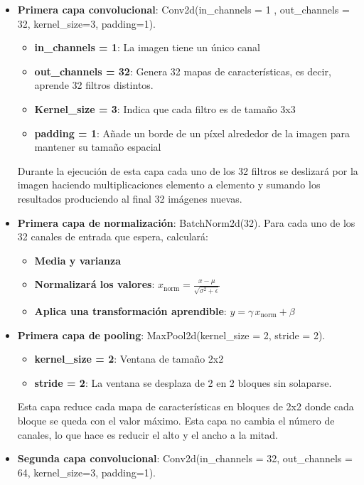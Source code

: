 \begin{itemize}
	\item \textbf{Primera capa convolucional}: Conv2d(in\_channels = 1 , out\_channels = 32, kernel\_size=3, padding=1). 
	  \begin{itemize}
	 	\item \textbf{in\_channels = 1}: La imagen tiene un único canal
	 	\item \textbf{out\_channels = 32}: Genera 32 mapas de características, es decir, aprende 32 filtros distintos.
	 	\item \textbf{Kernel\_size = 3}: Indica que cada filtro es de tamaño 3x3
	 	\item \textbf{padding = 1}: Añade un borde de un píxel alrededor de la imagen para mantener su tamaño espacial
	   \end{itemize}
	
	Durante la ejecución de esta capa cada uno de los 32 filtros se deslizará por la imagen haciendo multiplicaciones elemento a elemento y sumando los resultados produciendo al final 32 imágenes nuevas.
	
	\item \textbf{Primera capa de normalización}: BatchNorm2d(32). Para cada uno de los 32 canales de entrada que espera, calculará:
	  \begin{itemize}
	 	\item \textbf{Media y varianza}
	 	\item \textbf{Normalizará los valores}: $x_{\text{norm}} = \frac{x - \mu}{\sqrt{\sigma^2 + \epsilon}}$
	 	\item \textbf{Aplica una transformación aprendible}: $y = \gamma \, x_{\text{norm}} + \beta$
	  \end{itemize}
	
	\item \textbf{Primera capa de pooling}: MaxPool2d(kernel\_size = 2, stride = 2).
	  \begin{itemize}
	 	\item \textbf{kernel\_size = 2}: Ventana de tamaño 2x2
	 	\item \textbf{stride = 2}: La ventana se desplaza de 2 en 2 bloques sin solaparse.
	  \end{itemize}
	  Esta capa reduce cada mapa de características en bloques de 2x2 donde cada bloque se queda con el valor máximo. Esta capa no cambia el número de canales, lo que hace es reducir el alto y el ancho a la mitad.
	   
	\item \textbf{Segunda capa convolucional}: Conv2d(in\_channels = 32, out\_channels = 64, kernel\_size=3, padding=1).
	

\end{itemize}
